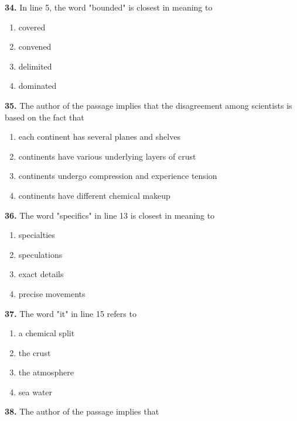 \documentclass[12pt]{article}
\begin{document}
\par
\vspace{0.25\baselineskip}
\noindent\textbf{34.} In line 5, the word "bounded" is closest in meaning to
\begin{enumerate}[label=(\Alph*),leftmargin=*,itemsep=0.2em]
\item covered
\item convened
\item delimited
\item dominated
\end{enumerate}
\par
\vspace{0.25\baselineskip}
\noindent\textbf{35.} The author of the passage implies that the disagreement among scientists is based on the fact that
\begin{enumerate}[label=(\Alph*),leftmargin=*,itemsep=0.2em]
\item each continent has several planes and shelves
\item continents have various underlying layers of crust
\item continents undergo compression and experience tension
\item continents have different chemical makeup
\end{enumerate}
\par
\vspace{0.25\baselineskip}
\noindent\textbf{36.} The word "specifics" in line 13 is closest in meaning to
\begin{enumerate}[label=(\Alph*),leftmargin=*,itemsep=0.2em]
\item specialties
\item speculations
\item exact details
\item precise movements
\end{enumerate}
\par
\vspace{0.25\baselineskip}
\noindent\textbf{37.} The word "it" in line 15 refers to
\begin{enumerate}[label=(\Alph*),leftmargin=*,itemsep=0.2em]
\item a chemical split
\item the crust
\item the atmosphere
\item sea water
\end{enumerate}
\par
\vspace{0.25\baselineskip}
\noindent\textbf{38.} The author of the passage implies that
\end{document}
